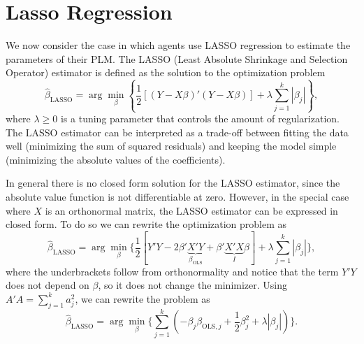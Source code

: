 \documentclass[11pt]{article}
\begin{document}
\section{Lasso Regression}

We now consider the case in which agents use LASSO regression to estimate the parameters of their PLM.
The LASSO (Least Absolute Shrinkage and Selection Operator) estimator is defined as the solution to the optimization problem
\[
\hat{\beta}_{\text{LASSO}} = \arg\min_{\beta} \left\{\frac{1}{2}\left[(Y - X\beta)'(Y - X\beta)\right] + \lambda \sum_{j=1}^{k} |\beta_j|\right\},
\]
where $\lambda \geq 0$ is a tuning parameter that controls the amount of regularization. The LASSO estimator can be interpreted as a trade-off between fitting the data well (minimizing the sum of squared residuals) and keeping the model simple (minimizing the absolute values of the coefficients).

In general there is no closed form solution for the LASSO estimator, since the absolute value function is not differentiable at zero. However, in the special case where $X$ is an orthonormal matrix, the LASSO estimator can be expressed in closed form.
To do so we can rewrite the optimization problem as
\[
\hat{\beta}_{\text{LASSO}} 
= \arg\min_{\beta} 
\Big\{ \frac{1}{2}\left[Y'Y - 2\beta'\underbrace{X'Y}_{\beta_{\text{OLS}}} 
+ \beta'\underbrace{X'X}_{I}\beta\right]
+ \lambda \sum_{j=1}^{k} |\beta_j| \Big\},
\]
where the underbrackets follow from orthonormality and notice that the term $Y'Y$ does not depend on $\beta$, so it does not change the minimizer.
Using $A'A = \sum_{j=1}^{k} a_j^2$, we can rewrite the problem as
\[
\hat{\beta}_{\text{LASSO}} = \arg\min_{\beta} \Big\{ \sum_{j=1}^{k} \left( -\beta_j \beta_{\text{OLS},j} + \frac{1}{2}\beta_j^2 + \lambda |\beta_j| \right) \Big\}.
\]
\end{document}
